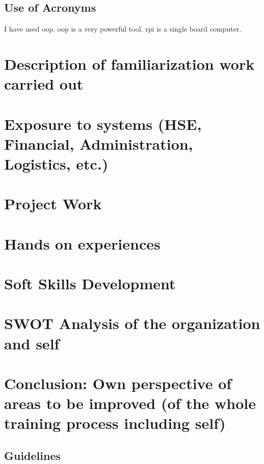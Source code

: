 \documentclass[a4paper,12pt]{report}%
\begin{document}
\section{Use of Acronyms}


I have used \ac{oop}. \ac{oop} is a very powerful tool. \Ac{rpi} is a single board computer. 

\chapter{Description of familiarization work carried out}

\chapter{Exposure to systems (HSE, Financial, Administration, Logistics, etc.)}

\chapter{Project Work}

\chapter{Hands on experiences}

\chapter{Soft Skills Development}

\chapter{SWOT Analysis of the organization and self}

\chapter{Conclusion: Own perspective of areas to be improved (of the whole training process including self)}


\begin{appendices}
	\chapter{Guidelines}
\end{appendices}




\end{document}
